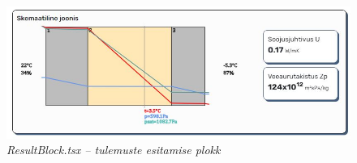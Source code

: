 \begin{figure}[ht]
    \centering
    \includegraphics[width=1\textwidth]{figures/development/frontend_result_block.JPG}
    \caption[ResultBlock.tsx -- tulemuste esitamise plokk]{\textit{ResultBlock.tsx -- tulemuste esitamise plokk}}
    \label{fig:development_frontend_results}
\end{figure}


